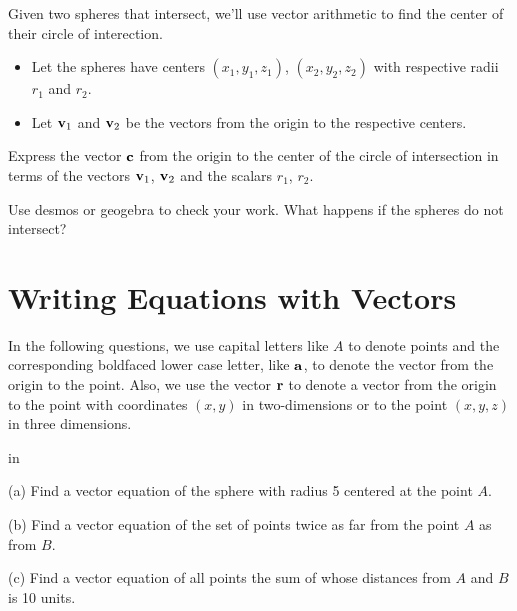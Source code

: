 \documentclass{ximera}
\newcommand{\pskip}{\vskip 0.1 in}
\begin{document}
\begin{question}  \label{Q45367:Vectors}
Given two spheres that intersect, we'll use vector arithmetic to find the center of their circle of interection.

\begin{itemize}

\item{Let the spheres have centers $(x_1, y_1, z_1)$, $(x_2, y_2, z_2)$ with respective radii $r_1$ and $r_2$.} 

\item{Let ${\bf v}_1$ and ${\bf v}_2$ be the vectors from the origin to the respective centers.}

\end{itemize}

Express the vector ${\bf c}$ from the origin to the center of the circle of intersection in terms of the vectors ${\bf v}_1$, ${\bf v}_2$ and the scalars $r_1$, $r_2$. 

Use desmos or geogebra to check your work. What happens if the spheres do not intersect?

\end{question}



\section{Writing Equations with Vectors}

\begin{question}  \label{Eq:32404:Vectors}
In the following questions, we use capital letters like $A$ to denote points and the corresponding boldfaced lower case letter, like ${\bf a}$, to denote the vector from the origin to the point. Also, we use the vector ${\bf r}$ to denote a vector from the origin to the point with coordinates $(x,y)$ in two-dimensions or to the point $(x,y,z)$ in three dimensions.

\pskip

(a) Find a vector equation of the sphere with radius 5 centered at the point $A$.

(b) Find a vector equation of the set of points twice as far from the point $A$ as from $B$.

(c) Find a vector equation of all points the sum of whose distances from $A$ and $B$ is 10 units.


\end{question}
\end{document}
